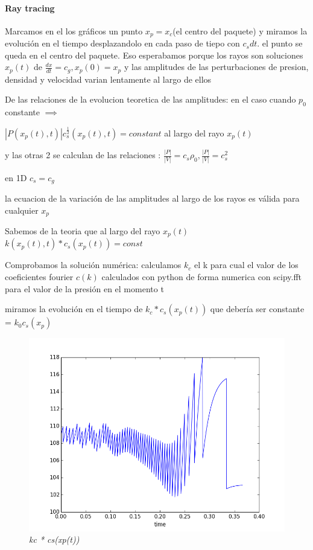 \documentclass{article}
\begin{document}
\newpage

\paragraph{Ray tracing}

\begin{description}
\item Marcamos en el los gráficos un punto $x_p = x_c$(el centro del paquete) y miramos la evolución en el tiempo desplazandolo en cada paso de tiepo con $c_s dt$. el punto se queda en el centro del paquete. Eso esperabamos porque los rayos son soluciones 
$x_p(t)$ de $\frac{dx}{dt} = c_g, x_p(0) = x_p$ y las amplitudes de las perturbaciones de presion, densidad y velocidad varian lentamente al largo de ellos  
\item De las relaciones de  la evolucion teoretica de las amplitudes: en el caso cuando $ p_0$ constante $\implies$  
\item $|P(x_p(t),t)| c_s^{\frac{1}{2}}(x_p(t),t) = constant $ al largo del rayo $x_p(t)$
\item y las otras 2 se calculan de las relaciones : $\frac{|P|}{|V|} = c_s \rho_0 , \frac{|P|}{|V|} = c_s^2$
\item en 1D $c_s=c_g$
\item la ecuacion de la variación de las amplitudes al largo de los rayos es válida para cualquier $x_p$

\item Sabemos de la teoria que al largo del rayo $x_p(t)$ $k(x_p(t),t) * c_s(x_p(t)) = const$ 
\item Comprobamos la solución numérica: calculamos $k_c$ el k para cual el valor de los coeficientes fourier $c(k)$ calculados con python 
de forma numerica con scipy.fft para el valor de la presión en el momento t
\item miramos la evolución en el tiempo de $k_c * c_s(x_p(t)) $ que debería ser constante = $k_0 c_s(x_p)$


\item \begin{figure}[!ht]
 \centering
 \includegraphics[scale=0.5]{kcinhom1.png}
 \caption{\emph{kc * cs(xp(t))}}
\end{figure}


\end{description}
\end{document}

